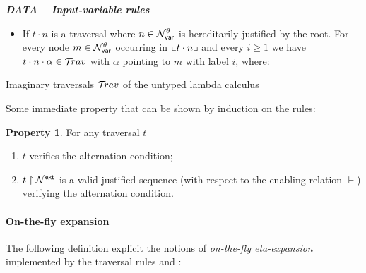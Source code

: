 \documentclass{article}
\theoremstyle{definition}
\newtheorem{property}{Property}[section]
\newcommand\Nodes{\mathcal{N}}%
\newcommand\NodesVar{\Nodes_{\sf var}}%
\newcommand{\ghostlmd}{{\lambda\!\!\lambda}}
\newcommand{\ghostvar}{\theta}
\newcommand\ImNodesVar{\NodesVar^\ghostvar}
\newcommand{\travulc}{\travset}
\newcommand{\enables}{\vdash} %
\newcommand{\ExtNodes}{\Nodes^{\sf ext}}
\begin{document}
\begin{FramedTable}
\emph{\bf DATA -- Input-variable rules}
\begin{itemize}
\item {} If $t \cdot n$ is a traversal where $n \in \ImNodesVar$ is hereditarily justified by the root. For every node $m \in \ImNodesVar$ occurring in $\llcorner t\cdot n \lrcorner$
and every $i\geq1$ we have $t \cdot n \cdot\alpha\in\travulc$ with $\alpha$ pointing to $m$ with label $i$, where:
\end{itemize}


\caption{Imaginary traversals $\travulc$ of the untyped lambda calculus}
 \label{tab:trav_rules}
\end{FramedTable}

Some immediate property that can be shown by induction on the rules:
\begin{property}
   For any traversal $t$
   \begin{enumerate}
   \item $t$ verifies the alternation condition;
   \item $t\filter\ExtNodes$ is a valid justified sequence (with respect to the enabling relation $\enables$) verifying the alternation condition.
   \end{enumerate}
\end{property}




\paragraph{On-the-fly expansion}
The following definition explicit the notions of \emph{on-the-fly eta-expansion} implemented by the
traversal rules  and :
\end{document}
